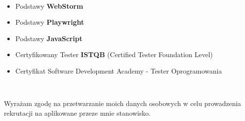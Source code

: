 \documentclass[10pt,a4paper,ragged2e,withhyper]{altacv}
\begin{document}
\begin{paracol}{2}
\\



\begin{itemize}
\item Podstawy \textbf{WebStorm}
\item Podstawy \textbf{Playwright}
\item Podstawy \textbf{JavaScript}
\end{itemize}


\begin{itemize}
\item Certyfikowany Tester \textbf{ISTQB} (Certified Tester Foundation Level)
\item Certyfikat Software Development Academy - Tester Oprogramowania
\end{itemize}


\\

\divider



\divider



\end{paracol}

\vfill
\begin{center}Wyrażam zgodę na przetwarzanie moich danych osobowych w celu prowadzenia rekrutacji na aplikowane przeze mnie stanowisko.
\end{center}
\end{document}

